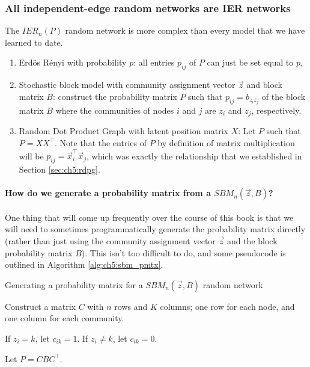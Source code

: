 \subsubsection{All independent-edge random networks are IER networks}
\label{sec:ch5:ier:ier_generalises}
The $IER_n(P)$ random network is more complex than every model that we have learned to date.
\begin{enumerate}
    \item Erd\"os R\'enyi with probability $p$: all entries $p_{ij}$ of $P$ can just be set equal to $p$,
    \item Stochastic block model with community assignment vector $\vec z$ and block matrix $B$: construct the probability matrix $P$ such that $p_{ij} = b_{z_iz_j}$ of the block matrix $B$ where the communities of nodes $i$ and $j$ are $z_i$ and $z_j$, respectively.
    \item Random Dot Product Graph with latent position matrix $X$: Let $P$ such that $P = XX^\top$. Note that the entries of $P$ by definition of matrix multiplication will be $p_{ij} = \vec x_i^\top \vec x_j$, which was exactly the relationship that we established in Section \ref{sec:ch5:rdpg}.
\end{enumerate}

\paragraph{How do we generate a probability matrix from a $SBM_n(\vec z, B)$?}
\label{sec:ch5:ier:sbm_pmtx}
One thing that will come up frequently over the course of this book is that we will need to sometimes programmatically generate the probability matrix directly (rather than just using the community assignment vector $\vec z$ and the block probability matrix $B$). This isn't too difficult to do, and some pseudocode is outlined in Algorithm \ref{alg:ch5:sbm_pmtx}.

\begin{algorithm}[h]\caption{Generating a probability matrix for a $SBM_n(\vec z, B)$ random network}
\label{alg:ch5:sbm_pmtx}
\SetAlgoLined
{}

Construct a matrix $C$ with $n$ rows and $K$ columns; one row for each node, and one column for each community.

 {
     {
        If $z_i = k$, let $c_{ik} = 1$. If $z_i \neq k$, let $c_{ik} = 0$.
    }
}

Let $P = CBC^\top$.
\end{algorithm}

